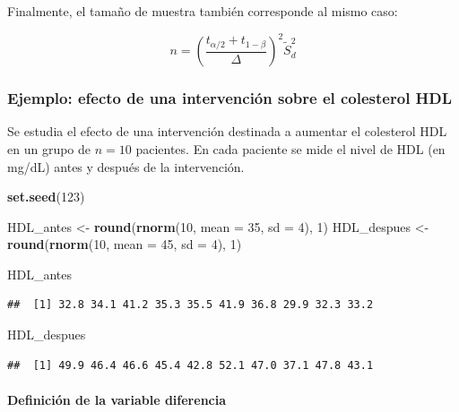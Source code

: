 \documentclass[
]{article}
\newenvironment{Shaded}{\begin{snugshade}}{\end{snugshade}}
\newcommand{\AttributeTok}[1]{\textcolor[rgb]{0.13,0.29,0.53}{#1}}
\newcommand{\DecValTok}[1]{\textcolor[rgb]{0.00,0.00,0.81}{#1}}
\newcommand{\FunctionTok}[1]{\textcolor[rgb]{0.13,0.29,0.53}{\textbf{#1}}}
\newcommand{\NormalTok}[1]{#1}
\newcommand{\OtherTok}[1]{\textcolor[rgb]{0.56,0.35,0.01}{#1}}
\begin{document}
Finalmente, el tamaño de muestra también corresponde al mismo caso:

\[
n=\left(\frac{t_{\alpha / 2}+t_{1-\beta}}{\Delta}\right)^{2} \widetilde{S}_{d}^{2}
\]

\subsubsection{Ejemplo: efecto de una intervención sobre el colesterol HDL}\label{ejemplo-efecto-de-una-intervenciuxf3n-sobre-el-colesterol-hdl}

Se estudia el efecto de una intervención destinada a aumentar el colesterol HDL en un grupo de \(n = 10\) pacientes.
En cada paciente se mide el nivel de HDL (en mg/dL) antes y después de la intervención.

\begin{Shaded}
\begin{Highlighting}[]
\FunctionTok{set.seed}\NormalTok{(}\DecValTok{123}\NormalTok{)}

\NormalTok{HDL\_antes   }\OtherTok{\textless{}{-}} \FunctionTok{round}\NormalTok{(}\FunctionTok{rnorm}\NormalTok{(}\DecValTok{10}\NormalTok{, }\AttributeTok{mean =} \DecValTok{35}\NormalTok{, }\AttributeTok{sd =} \DecValTok{4}\NormalTok{), }\DecValTok{1}\NormalTok{)}
\NormalTok{HDL\_despues }\OtherTok{\textless{}{-}} \FunctionTok{round}\NormalTok{(}\FunctionTok{rnorm}\NormalTok{(}\DecValTok{10}\NormalTok{, }\AttributeTok{mean =} \DecValTok{45}\NormalTok{, }\AttributeTok{sd =} \DecValTok{4}\NormalTok{), }\DecValTok{1}\NormalTok{)}

\NormalTok{HDL\_antes}
\end{Highlighting}
\end{Shaded}

\begin{verbatim}
##  [1] 32.8 34.1 41.2 35.3 35.5 41.9 36.8 29.9 32.3 33.2
\end{verbatim}

\begin{Shaded}
\begin{Highlighting}[]
\NormalTok{HDL\_despues}
\end{Highlighting}
\end{Shaded}

\begin{verbatim}
##  [1] 49.9 46.4 46.6 45.4 42.8 52.1 47.0 37.1 47.8 43.1
\end{verbatim}

\paragraph{Definición de la variable diferencia}\label{definiciuxf3n-de-la-variable-diferencia}
\end{document}
